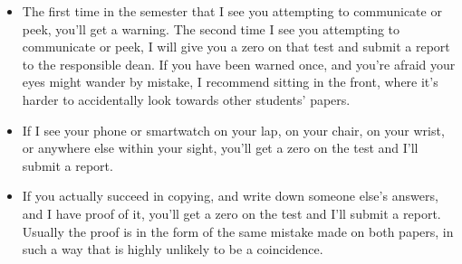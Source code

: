 \documentclass[12pt, twoside]{article}
\begin{document}
\begin{itemize}
   \item The first time in the semester that I see you attempting to communicate or peek, you'll get a warning. The second time I see you attempting to communicate or peek, I will give you a zero on that test and submit a report to the responsible dean. If you have been warned once, and you're afraid your eyes might wander by mistake, I recommend sitting in the front, where it's harder to accidentally look towards other students' papers.
   \item If I see your phone or smartwatch on your lap, on your chair, on your wrist, or anywhere else within your sight, you'll get a zero on the test and I'll submit a report.
   \item If you actually succeed in copying, and write down someone else's answers, and I have proof of it, you'll get a zero on the test and I'll submit a report. Usually the proof is in the form of the same mistake made on both papers, in such a way that is highly unlikely to be a coincidence. 
\end{itemize}

\newpage




   





   
\end{document}
